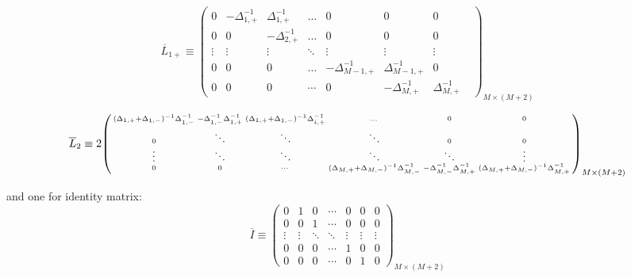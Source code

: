 \documentclass[11pt]{article}
\newenvironment{psmallmatrix}
{\left(\begin{smallmatrix}}
	{\end{smallmatrix}\right)}
\theoremstyle{definition}
\begin{document}
\begin{equation}\label{eq:L-1-plus-extended}
\overline{L}_{1+} \equiv \begin{pmatrix}
0&-\Delta_{1,+}^{-1}&\Delta_{1,+}^{-1}&\dots&0&0&0\\
0&0&-\Delta_{2,+}^{-1}&\dots&0&0&0\\
\vdots&\vdots&\vdots&\ddots&\vdots&\vdots&\vdots\\
0&0&0&\dots&-\Delta_{M-1,+}^{-1}&\Delta_{M-1,+}^{-1}&0\\
0&0&0&\cdots&0&-\Delta_{M,+}^{-1}&\Delta_{M,+}^{-1}&
\end{pmatrix}_{M\times (M+2)}
\end{equation}


\begin{equation}\label{eq:L-2-extended} \small
\overline{L}_2 \equiv 2 \begin{psmallmatrix}
(\Delta_{1,+}+\Delta_{1,-})^{-1}\Delta_{1,-}^{-1} &-\Delta_{1,-}^{-1} \Delta_{1,+}^{-1}  & (\Delta_{1,+}+\Delta_{1,-})^{-1} \Delta_{i,+}^{-1}&\dots&0&0\\
0 & \ddots & \ddots &\ddots & 0 & 0\\ 
\vdots&\ddots &\ddots & \ddots & \ddots & \vdots\\ 
0&0&\cdots&
(\Delta_{M,+}+\Delta_{M,-})^{-1}\Delta_{M,-}^{-1} &-\Delta_{M,-}^{-1} \Delta_{M,+}^{-1}  & 
(\Delta_{M,+}+\Delta_{M,-})^{-1}\Delta_{M,+}^{-1}
\end{psmallmatrix}_{M\times (M+2)}
\end{equation}

and one for identity matrix:
\begin{equation}\label{eq:I-extended} 
\overline{I} \equiv \begin{pmatrix}
0 & 1 & 0 & \cdots & 0 & 0 & 0\\
0 & 0 & 1 & \cdots & 0 & 0 & 0\\
\vdots & \vdots  & \ddots & \ddots &  \vdots  & \vdots  & \vdots  \\
0 & 0 & 0 & \cdots & 1 & 0 & 0 \\
0 & 0 & 0 & \cdots & 0 & 1 & 0
\end{pmatrix}_{M\times (M+2)}
\end{equation}
\end{document}
